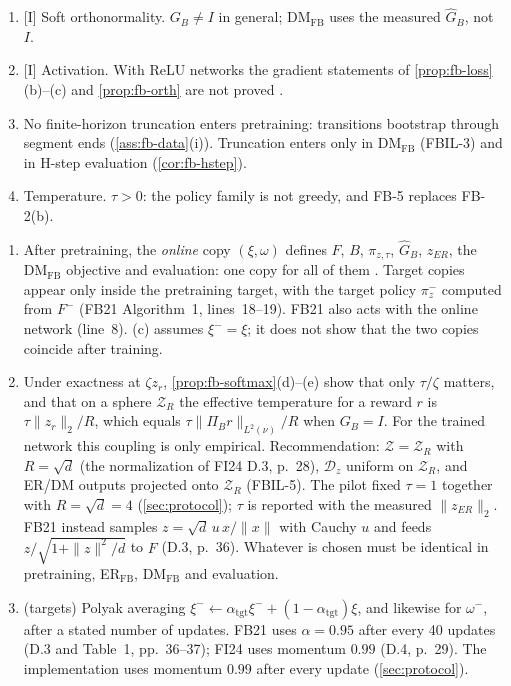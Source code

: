 \begin{remark}
\begin{enumerate}[nosep,label=(\arabic*)]
\item \textsf{[I] Soft orthonormality.} $G_B\ne I$ in general; DM$_{\mathrm{FB}}$ uses the measured $\hat G_B$, not $I$.
\item \textsf{[I] Activation.} With ReLU networks the gradient statements of \cref{prop:fb-loss}(b)--(c) and \cref{prop:fb-orth} are not proved .
\item \textsf{No finite-horizon truncation} enters pretraining: transitions bootstrap through segment ends (\cref{ass:fb-data}(i)). Truncation enters only in DM$_{\mathrm{FB}}$ (FBIL-3) and in H-step evaluation (\cref{cor:fb-hstep}).
\item \textsf{Temperature.} $\tau>0$: the policy family is not greedy, and FB-5 replaces FB-2(b).
\end{enumerate}
\end{remark}

\begin{remark}\label{rem:fb-design}
\leavevmode
\begin{enumerate}[nosep,label=D\arabic*.]
\item {} After pretraining, the \emph{online} copy $(\xi,\omega)$ defines $F$, $B$, $\pi_{z,\tau}$, $\hat G_B$, $z_{ER}$, the DM$_{\mathrm{FB}}$ objective and evaluation: one copy for all of them .
  Target copies appear only inside the pretraining target, with the target policy $\pi^-_z$ computed from $F^-$ (FB21 Algorithm~1, lines~18--19). FB21 also acts with the online network (line~8).
  (c) assumes $\xi^-=\xi$; it does not show that the two copies coincide after training.
\item {} Under exactness at $\zeta z_r$, \cref{prop:fb-softmax}(d)--(e) show that only $\tau/\zeta$ matters, and that on a sphere $\mathcal Z_R$ the effective temperature for a reward $r$ is $\tau\|z_r\|_2/R$, which equals $\tau\|\Pi_Br\|_{L^2(\nu)}/R$ when $G_B=I$. For the trained network this coupling is only empirical.
  Recommendation: $\mathcal Z=\mathcal Z_R$ with $R=\sqrt d$ (the normalization of FI24 D.3, p.~28), $\mathcal D_z$ uniform on $\mathcal Z_R$, and ER/DM outputs projected onto $\mathcal Z_R$ (FBIL-5).
  The pilot fixed $\tau=1$ together with $R=\sqrt d=4$ (\cref{sec:protocol}); $\tau$ is reported with the measured $\|z_{ER}\|_2$.
  FB21 instead samples $z=\sqrt d\,u\,x/\|x\|$ with Cauchy $u$ and feeds $z/\sqrt{1+\|z\|^2/d}$ to $F$ (D.3, p.~36). Whatever is chosen must be identical in pretraining, ER$_{\mathrm{FB}}$, DM$_{\mathrm{FB}}$ and evaluation.
\item (targets) Polyak averaging $\xi^-\leftarrow\alpha_{\mathrm{tgt}}\xi^-+(1-\alpha_{\mathrm{tgt}})\xi$, and likewise for $\omega^-$, after a stated number of updates. FB21 uses $\alpha=0.95$ after every 40 updates (D.3 and Table~1, pp.~36--37); FI24 uses momentum $0.99$ (D.4, p.~29). The implementation uses momentum $0.99$ after every update (\cref{sec:protocol}).
\end{enumerate}
\end{remark}
